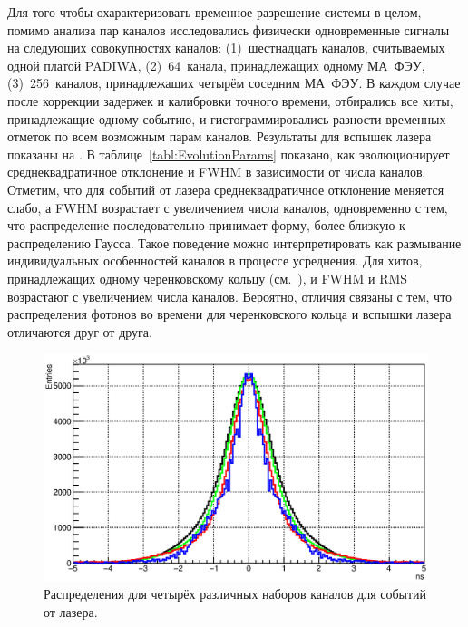 Для того чтобы охарактеризовать временное разрешение системы в целом, помимо анализа пар каналов исследовались физически одновременные сигналы на следующих совокупностях каналов: (1)~шестнадцать каналов, считываемых одной платой PADIWA, (2)~64~канала, принадлежащих одному МА~ФЭУ, (3)~256~каналов, принадлежащих четырём соседним МА~ФЭУ. В каждом случае после коррекции задержек и калибровки точного времени, отбирались все хиты, принадлежащие одному событию, и гистограммировались разности временных отметок по всем возможным парам каналов. Результаты для вспышек лазера показаны на . В таблице~\ref{tabl:EvolutionParams} показано, как эволюционирует среднеквадратичное отклонение и FWHM в зависимости от числа каналов. Отметим, что для событий от лазера среднеквадратичное отклонение меняется слабо, а FWHM возрастает с увеличением числа каналов, одновременно с тем, что распределение последовательно принимает форму, более близкую к распределению Гаусса. Такое поведение можно интерпретировать как размывание индивидуальных особенностей каналов в процессе усреднения. Для хитов, принадлежащих одному черенковскому кольцу (см.~), и FWHM и RMS возрастают с увеличением числа каналов. Вероятно, отличия связаны с тем, что распределения фотонов во времени для черенковского кольца и вспышки лазера отличаются друг от друга.

\begin{figure}
\includegraphics[width=1.0\textwidth]{pictures/24_TimePrecision_evolution_laser.eps}
\caption{Распределения для четырёх различных наборов каналов для событий от лазера.}
\label{fig:TimeResEvolutionLaser}
\end{figure}

